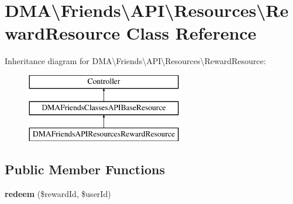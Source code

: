 \hypertarget{classDMA_1_1Friends_1_1API_1_1Resources_1_1RewardResource}{}\section{D\+M\+A\textbackslash{}Friends\textbackslash{}A\+P\+I\textbackslash{}Resources\textbackslash{}Reward\+Resource Class Reference}
\label{classDMA_1_1Friends_1_1API_1_1Resources_1_1RewardResource}
Inheritance diagram for D\+M\+A\textbackslash{}Friends\textbackslash{}A\+P\+I\textbackslash{}Resources\textbackslash{}Reward\+Resource\+:\begin{figure}[H]
\begin{center}
\leavevmode
\includegraphics[height=3.000000cm]{da/d5c/classDMA_1_1Friends_1_1API_1_1Resources_1_1RewardResource}
\end{center}
\end{figure}
\subsection*{Public Member Functions}
\begin{DoxyCompactItemize}
\item 
\hypertarget{classDMA_1_1Friends_1_1API_1_1Resources_1_1RewardResource_a92db6c3df30532f00ba60711ce84bf45}{}{\bfseries redeem} (\$reward\+Id, \$user\+Id)\label{classDMA_1_1Friends_1_1API_1_1Resources_1_1RewardResource_a92db6c3df30532f00ba60711ce84bf45}

\end{DoxyCompactItemize}
